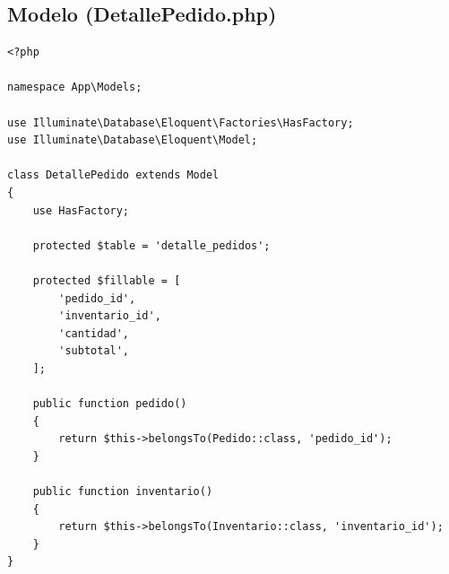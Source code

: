 \documentclass[12pt, letterpaper]{article}
\begin{document}
\subsection{Modelo (DetallePedido.php)}
\begin{lstlisting}[language=purePHP]
<?php

namespace App\Models;

use Illuminate\Database\Eloquent\Factories\HasFactory;
use Illuminate\Database\Eloquent\Model;

class DetallePedido extends Model
{
    use HasFactory;

    protected $table = 'detalle_pedidos';

    protected $fillable = [
        'pedido_id',
        'inventario_id',
        'cantidad',
        'subtotal',
    ];

    public function pedido()
    {
        return $this->belongsTo(Pedido::class, 'pedido_id');
    }

    public function inventario()
    {
        return $this->belongsTo(Inventario::class, 'inventario_id');
    }
}
\end{lstlisting}
\end{document}
